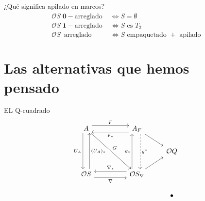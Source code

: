 \documentclass[compress,12pt]{beamer}
\begin{document}
\begin{frame}{¿Qué significa apilado en marcos?}
	\[
		\begin{split}
			\mathcal{O}S\; \mathbf{0}-\mbox{arreglado }& \Leftrightarrow S=\emptyset\\
			\mathcal{O}S\; \mathbf{1}-\mbox{arreglado }& \Leftrightarrow S \mbox{ es } T_2\\
			\mathcal{O}S\, \mbox{ arreglado }& \Leftrightarrow S \mbox{ empaquetado }+ \mbox{ apilado}
		\end{split}
	\]
\end{frame}

\section{Las alternativas que hemos pensado}
\begin{frame}[fragile]{EL Q-cuadrado}
\[\begin{tikzcd}
	A && {A_F} \\
	&&& {\mathcal{O}Q} \\
	{\mathcal{O}S} && {\mathcal{O}S_\nabla} \\
	&&& \bullet
	\arrow["F", shift left=2, from=1-1, to=1-3]
	\arrow["{U_A}"', shift right=2, from=1-1, to=3-1]
	\arrow["G", from=1-1, to=3-3]
	\arrow["{F_*}", shift left=2, from=1-3, to=1-1]
	\arrow[from=1-3, to=2-4]
	\arrow["{g^*}", shift left=2, dashed, from=1-3, to=3-3]
	\arrow["{(U_A)_*}"', shift right=2, from=3-1, to=1-1]
	\arrow["\nabla"', shift right=2, from=3-1, to=3-3]
	\arrow["{g_*}", shift left=3, from=3-3, to=1-3]
	\arrow[from=3-3, to=2-4]
	\arrow["{\nabla_*}"', shift right=2, from=3-3, to=3-1]
\end{tikzcd}\]
\end{frame}

\End
\end{document}
